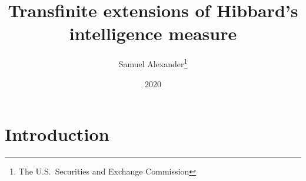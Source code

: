 \documentclass{article}
\title{Transfinite extensions of Hibbard's intelligence measure}
\author{Samuel Alexander\thanks{The U.S.\ Securities and Exchange Commission}}
\date{2020}
\begin{document}
\maketitle

\section{Introduction}



\end{document}
